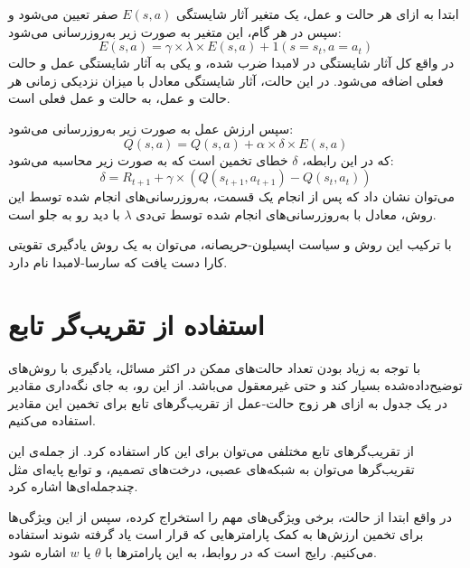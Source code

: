 ابتدا به ازای هر حالت و عمل، یک متغیر آثار شایستگی $E(s, a)$
صفر تعیین می‌شود و سپس در هر گام، این متغیر به صورت زیر به‌روز‌رسانی می‌شود:
\begin{equation}\label{eq:eligibility_trace}
    E(s, a) = \gamma \times \lambda \times E(s, a) + 1(s = s_t, a = a_t)
\end{equation}
در واقع کل آثار شایستگی در لامبدا ضرب شده، و یکی به آثار شایستگی عمل و حالت فعلی اضافه می‌شود.
در این حالت، آثار شایستگی معادل با میزان نزدیکی زمانی هر حالت و عمل، به حالت و عمل فعلی است.

سپس ارزش عمل به صورت زیر به‌روز‌رسانی می‌شود:
\begin{equation}\label{eq:td_lambda_backward_q_function}
    Q(s, a) = Q(s, a) + \alpha \times \delta \times E(s, a)
\end{equation}
که در این رابطه، $\delta$
خطای تخمین
 است که به صورت زیر محاسبه می‌شود:
\begin{equation}\label{eq:td_lambda_backward_delta}
    \delta = R_{t+1} + \gamma \times (Q(s_{t+1}, a_{t+1}) - Q(s_t, a_t))
\end{equation}
می‌توان نشان داد که پس از انجام یک قسمت، به‌روز‌رسانی‌های انجام شده توسط این روش، معادل با به‌روز‌رسانی‌های انجام شده توسط تی‌دی $\lambda$ با دید رو به جلو است.

با ترکیب این روش و سیاست اپسیلون-حریصانه، می‌توان به یک روش یادگیری تقویتی کارا دست یافت که 
سارسا-لامبدا نام دارد.
\section{استفاده از تقریب‌گر تابع}
با توجه به زیاد بودن تعداد حالت‌های ممکن در اکثر مسائل، یادگیری با روش‌های توضیح‌داده‌شده بسیار کند و حتی غیرمعقول می‌باشد\cite{kimura1997reinforcement}.
از این رو، به جای نگه‌داری مقادیر  
در یک جدول به ازای هر زوج حالت-عمل
 از تقریب‌گر‌های تابع
  برای تخمین این مقادیر استفاده می‌کنیم.

    از تقریب‌گر‌های تابع مختلفی می‌توان برای این کار استفاده کرد.
    از جمله‌ی این تقریب‌گر‌ها می‌توان به شبکه‌های عصبی، درخت‌های تصمیم، و توابع پایه‌ای مثل چندجمله‌ای‌ها اشاره کرد.

    در واقع ابتدا از حالت، برخی ویژگی‌های مهم را استخراج کرده، سپس از این ویژگی‌ها برای تخمین ارزش‌ها به کمک پارامتر‌هایی که قرار است یاد گرفته شوند استفاده می‌کنیم.
    رایج است که در روابط، به این پارامتر‌ها با 
    $\theta$ یا $w$
    اشاره شود.

